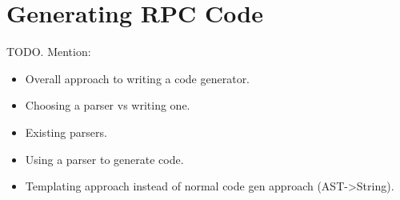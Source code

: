 \section{Generating RPC Code} %
\label{sec:generating_rpc_code}

TODO. Mention:
\begin{itemize}
	\item Overall approach to writing a code generator.
	\item Choosing a parser vs writing one.
	\item Existing parsers.
	\item Using a parser to generate code.
	\item Templating approach instead of normal code gen approach (AST->String).
\end{itemize}


